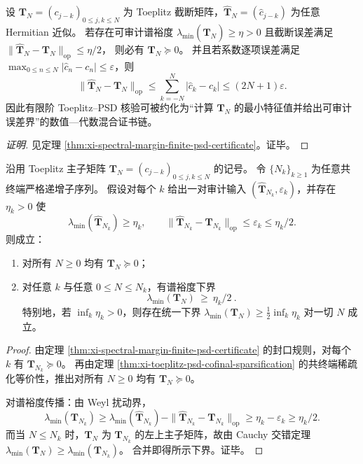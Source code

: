 \begin{conclusion}\label{con:xi-terminal-toeplitz-psd-numerical-robustness}
设 \(\mathbf{T}_N=(c_{j-k})_{0\le j,k\le N}\) 为 Toeplitz 截断矩阵，\(\widehat{\mathbf{T}}_N=(\widehat c_{j-k})\) 为任意 Hermitian 近似。
若存在可审计谱裕度 \(\lambda_{\min}(\widehat{\mathbf{T}}_N)\ge\eta>0\) 且截断误差满足
\(
\|\widehat{\mathbf{T}}_N-\mathbf{T}_N\|_{\mathrm{op}}\le \eta/2
\)，
则必有 \(\mathbf{T}_N\succeq 0\)。
并且若系数逐项误差满足 \(\max_{0\le n\le N}|\widehat c_n-c_n|\le\varepsilon\)，则
\[
\|\widehat{\mathbf{T}}_N-\mathbf{T}_N\|_{\mathrm{op}}
\le\sum_{k=-N}^{N}|\widehat c_k-c_k|
\le (2N+1)\varepsilon.
\]
因此有限阶 Toeplitz--PSD 核验可被约化为“计算 \(\widehat{\mathbf{T}}_N\) 的最小特征值并给出可审计误差界”的数值—代数混合证书链。
\end{conclusion}
\begin{proof}[证明]
见定理 \ref{thm:xi-spectral-margin-finite-psd-certificate}。证毕。
\end{proof}

\begin{theorem}\label{thm:xi-toeplitz-psd-robust-cofinal-audit}
沿用 Toeplitz 主子矩阵 \(\mathbf{T}_N=(c_{j-k})_{0\le j,k\le N}\) 的记号。
令 \(\{N_k\}_{k\ge 1}\) 为任意共终端严格递增子序列。
假设对每个 \(k\) 给出一对审计输入 \((\widehat{\mathbf{T}}_{N_k},\varepsilon_k)\)，并存在 \(\eta_k>0\) 使
\[
\lambda_{\min}(\widehat{\mathbf{T}}_{N_k})\ge \eta_k,
\qquad
\|\widehat{\mathbf{T}}_{N_k}-\mathbf{T}_{N_k}\|_{\mathrm{op}}\le \varepsilon_k\le \eta_k/2.
\]
则成立：
\begin{enumerate}
  \item 对所有 \(N\ge 0\) 均有 \(\mathbf{T}_N\succeq 0\)；
  \item 对任意 \(k\) 与任意 \(0\le N\le N_k\)，有谱裕度下界
  \[
  \boxed{\ \lambda_{\min}(\mathbf{T}_N)\ \ge\ \eta_k/2\ }.
  \]
  特别地，若 \(\inf_k\eta_k>0\)，则存在统一下界 \(\lambda_{\min}(\mathbf{T}_N)\ge \frac12\inf_k\eta_k\) 对一切 \(N\) 成立。
\end{enumerate}
\end{theorem}
\begin{proof}
由定理 \ref{thm:xi-spectral-margin-finite-psd-certificate} 的封口规则，对每个 \(k\) 有 \(\mathbf{T}_{N_k}\succeq 0\)。
再由定理 \ref{thm:xi-toeplitz-psd-cofinal-sparsification} 的共终端稀疏化等价性，推出对所有 \(N\ge 0\) 均有 \(\mathbf{T}_N\succeq 0\)。
\par
对谱裕度传播：由 Weyl 扰动界，
\[
\lambda_{\min}(\mathbf{T}_{N_k})
\ge
\lambda_{\min}(\widehat{\mathbf{T}}_{N_k})-\|\widehat{\mathbf{T}}_{N_k}-\mathbf{T}_{N_k}\|_{\mathrm{op}}
\ge
\eta_k-\varepsilon_k
\ge
\eta_k/2.
\]
而当 \(N\le N_k\) 时，\(\mathbf{T}_N\) 为 \(\mathbf{T}_{N_k}\) 的左上主子矩阵，故由 Cauchy 交错定理
\(
\lambda_{\min}(\mathbf{T}_N)\ge \lambda_{\min}(\mathbf{T}_{N_k})
\)。
合并即得所示下界。证毕。
\end{proof}

